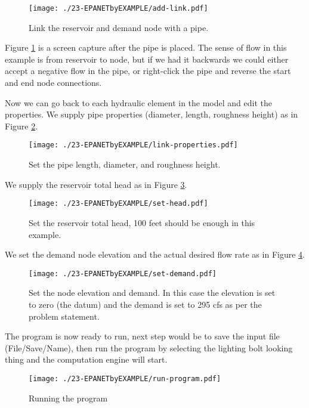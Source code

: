 \begin{figure}[htbp] %
   \centering
   \texttt{[image: ./23-EPANETbyEXAMPLE/add-link.pdf]} 
   \caption{Link the reservoir and demand node with a pipe.}
   \label{fig:add-link}
\end{figure}

Figure \ref{fig:add-link} is a screen capture after the pipe is placed.  The sense of flow in this example is from reservoir to node, but if we had it backwards we could either accept a negative flow in the pipe, or right-click the pipe and reverse the start and end node connections.

\newpage
Now we can go back to each hydraulic element in the model and edit the properties.  We supply pipe properties (diameter, length, roughness height) as in Figure \ref{fig:link-properties}.
\begin{figure}[h!] %
   \centering
   \texttt{[image: ./23-EPANETbyEXAMPLE/link-properties.pdf]} 
   \caption{Set the pipe length, diameter, and roughness height.}
   \label{fig:link-properties}
\end{figure}
We supply the reservoir total head as in Figure \ref{fig:set-head}.
\begin{figure}[htbp] %
   \centering
   \texttt{[image: ./23-EPANETbyEXAMPLE/set-head.pdf]} 
   \caption{Set the reservoir total head, 100 feet should be enough in this example.}
   \label{fig:set-head}
\end{figure}
\clearpage
We set the demand node elevation and the actual desired flow rate as in Figure \ref{fig:set-demand}.
\begin{figure}[htbp] %
   \centering
   \texttt{[image: ./23-EPANETbyEXAMPLE/set-demand.pdf]} 
   \caption{Set the node elevation and demand.  In this case the elevation is set to zero (the datum) and the demand is set to 295 cfs as per the problem statement.}
   \label{fig:set-demand}
\end{figure}
The program is now ready to run, next step would be to save the input file (File/Save/Name), then run the program by selecting the lighting bolt looking thing and the computation engine will start.  

\begin{figure}[htbp] %
   \centering
   \texttt{[image: ./23-EPANETbyEXAMPLE/run-program.pdf]} 
   \caption{Running the program}
   \label{fig:run-program}
\end{figure}

